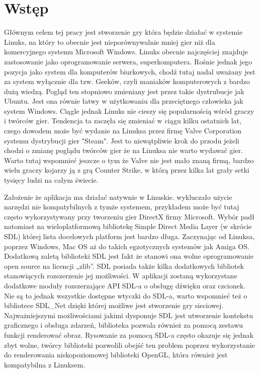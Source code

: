 \setcounter{secnumdepth}{-1}
\renewcommand{\chaptername}{}
\chapter{Wstęp} 
Głównym celem tej pracy jest stworzenie gry która będzie działać w systemie Linuks, na który to obecnie jest nieporównywalnie mniej gier niż dla komercyjnego systemu Microsoft Windows. Linuks obecnie najczęściej znajduje zastosowanie jako oprogramowanie serwera, superkomputera. Rośnie jednak jego pozycja jako system dla komputerów biurkowych, chodź tutaj nadal uważany jest za system wyłącznie dla tzw. Geeków, czyli maniaków komputerowych z bardzo dużą wiedzą. Pogląd ten stopniowo zmieniany jest przez takie dystrubucje jak Ubuntu. Jest ona równie łatwy w użytkowaniu dla przeciętnego człowieka jak system Windows. Ciągle jednak Linuks nie cieszy się popularnością wśród graczy i twórców gier. Tendencja ta zaczęła się zmieniać w ciągu kilku ostatnich lat, czego dowodem może być wydanie na Linuksa przez firmę Valve Corporation systemu dystrybucji gier "Steam". Jest to niewątpliwie krok do przodu jeżeli chodzi o zmianę poglądu twórców gier że na Linuksa nie warto wydawać gier. Warto tutaj wspomnieć jeszcze o tym że Valve nie jest mało znaną firmą, bardzo wielu graczy kojarzy ją z grą Counter Strike, w którą przez kilka lat grały setki tysięcy ludzi na całym świecie.

Założenie że aplikacja ma działać natywnie w Linuskie. wykluczało użycie narzędzi nie kompatybilnych z tymże systemem, przykładem może być tutaj często wykorzystywany przy tworzeniu gier DirectX firmy Microsoft. Wybór padł natomiast na wieloplatformową bibliotekę Simple Direct Media Layer (w skrócie SDL) której lista docelowych platform jest bardzo długa.
Zaczynając od Linuksa, poprzez Windows, Mac OS aż do takich egzotycznych systemów jak Amiga OS. Dodatkową zaletą biblioteki SDL jest fakt że stanowi ona wolne oprogramowanie open source na licencji „zlib”. SDL posiada także kilka dodatkowych bibliotek stanowiących rozszerzenie jej możliwości. W aplikacji zostaną wykorzystane dodatkowe moduły rozszerzające API SDL-a o obsługę
dźwięku oraz czcionek. Nie są to jednak wszystkie dostępne wtyczki do SDL-a, warto wspomnieć też o bibliotece SDL\_Net dzięki której możliwe jest stworzenie gry sieciowej. Najważniejszymi możliwościami jakimi dysponuje SDL jest utworzenie kontekstu graficznego i obsługa zdarzeń, biblioteka pozwala również za pomocą zestawu funkcji renderować obraz. Rysowanie za pomocą SDL-a często okazuje się jednak zbyt wolne, twórcy biblioteki pozwolili obejść ten problem poprzez wykorzystanie do renderowania 
niskopoziomowej biblioteki OpenGL, która również jest kompatybilna z Linuksem.

